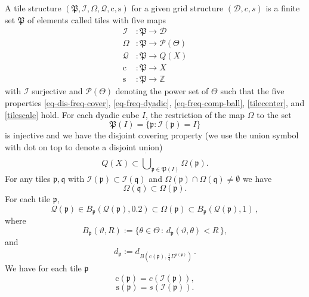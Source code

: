\documentclass[10pt,a4paper]{article}
\theoremstyle{plain}
\theoremstyle{definition}
\numberwithin{equation}{subsection}
\newcommand{\fp}{{\mathfrak p}}
\newcommand{\fP}{{\mathfrak P}}
\newcommand{\fq}{{\mathfrak q}}
\newcommand{\pc}{{\mathrm{c}}}
\newcommand{\ps}{{\mathrm{s}}}
\newcommand{\fc}{{\Omega}}
\newcommand{\scI}{{\mathcal{I}}} %
\newcommand{\tQ}{{Q}}
\newcommand{\mfa}{{\vartheta}}
\newcommand{\mfb}{{\theta}}
\newcommand{\Mf}{{\Theta}}
\newcommand{\fcc}{{\mathcal{Q}}}
\begin{document}
A tile structure $(\fP,\scI,\fc,\fcc,\pc,\ps)$
for a given grid structure $(\mathcal{D}, c, s)$
is a finite set $\fP$ of elements called tiles with five maps
\begin{align*}
    \scI&\colon \fP\to {\mathcal{D}}\\
    \fc&\colon \fP\to \mathcal{P}(\Mf) \\
    \fcc &\colon \fP\to \tQ(X)\\
    \pc &\colon \fP\to X\\
    \ps &\colon \fP\to \mathbb{Z}
\end{align*}
with $\scI$ surjective and $\mathcal{P}(\Mf)$ denoting the power set of $\Mf$ such that the five properties \eqref{eq-dis-freq-cover}, \eqref{eq-freq-dyadic},
\eqref{eq-freq-comp-ball}, \eqref{tilecenter}, and
\eqref{tilescale} hold.
For each dyadic cube $I$, the restriction of the map $\Omega$ to the set
\begin{equation}\label{injective}
    \fP(I)=\{\fp: \scI(\fp) =I\}
\end{equation}
is injective
and we have the disjoint covering property (we use the union symbol with dot on top to denote a disjoint union)
\begin{equation}\label{eq-dis-freq-cover}
    \tQ(X)\subset \dot{\bigcup}_{\fp\in \fP(I)}\fc(\fp).
\end{equation}
For any tiles $\fp,\fq$ with $\scI(\fp)\subset \scI(\fq)$ and $\fc(\fp) \cap \fc(\fq) \neq \emptyset$ we have
\begin{equation} \label{eq-freq-dyadic}
    \fc(\fq)\subset \fc(\fp) .
\end{equation}
For each tile $\fp$,
\begin{equation}\label{eq-freq-comp-ball}
    \fcc(\fp)\in B_{\fp}(\fcc(\fp), 0.2) \subset \fc(\fp) \subset B_{\fp}(\fcc(\fp),1)\,,
\end{equation}
where
\begin{equation}
    B_{\fp} (\mfa, R) := \{\mfb \in \Mf \, : \, d_{\fp}(\mfa, \mfb) < R\,\} ,
\end{equation}
and
\begin{equation}\label{defdp}
    d_{\fp} := d_{B(\pc(\fp),\frac 14 D^{\ps(\fp)})}\, .
\end{equation}
We have for each tile $\fp$
\begin{equation}\label{tilecenter}
    \pc(\fp)=c(\scI(\fp)),
\end{equation}
\begin{equation}\label{tilescale}
    \ps(\fp)=s(\scI(\fp)).
\end{equation}
\end{document}
